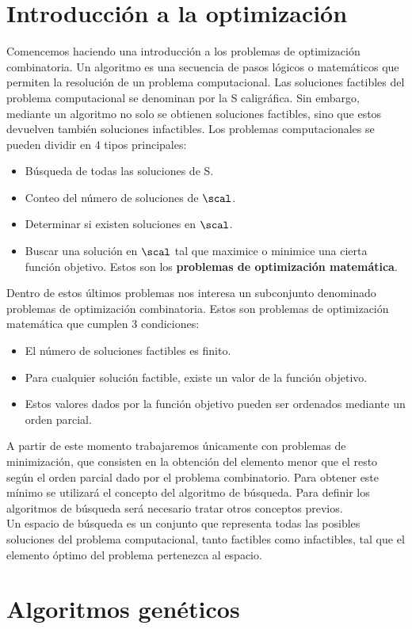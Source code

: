 \documentclass[a4paper]{article}
\begin{document}
\section{Introducción a la optimización}
Comencemos haciendo una introducción a los problemas de optimización combinatoria. Un algoritmo es una secuencia de pasos lógicos o matemáticos que permiten la resolución de un problema computacional. Las soluciones factibles del problema computacional se denominan por la S caligráfica. Sin embargo, mediante un algoritmo no solo se obtienen soluciones factibles, sino que estos devuelven también soluciones infactibles. Los problemas computacionales se pueden dividir en 4 tipos principales:
\begin{itemize}
    \item Búsqueda de todas las soluciones de S.
    \item Conteo del número de soluciones de $\scal$.
    \item Determinar si existen soluciones en $\scal$.
    \item Buscar una solución en $\scal$ tal que maximice o minimice una cierta función objetivo. Estos son los \textbf{problemas de optimización matemática}. 
\end{itemize}
Dentro de estos últimos problemas nos interesa un subconjunto denominado problemas de optimización combinatoria. Estos son problemas de optimización matemática que cumplen 3 condiciones:
\begin{itemize}
    \item El número de soluciones factibles es finito.
    \item Para cualquier solución factible, existe un valor de la función objetivo.
    \item Estos valores dados por la función objetivo pueden ser ordenados mediante un orden parcial.
\end{itemize}
A partir de este momento trabajaremos únicamente con problemas de minimización, que consisten en la obtención del elemento menor que el resto según el orden parcial dado por el problema combinatorio. Para obtener este mínimo se utilizará el concepto del algoritmo de búsqueda. Para definir los algoritmos de búsqueda será necesario tratar otros conceptos previos.\\

Un espacio de búsqueda es un conjunto que representa todas las posibles soluciones del problema computacional, tanto factibles como infactibles, tal que el elemento óptimo del problema pertenezca al espacio.
\section{Algoritmos genéticos}
\end{document}
